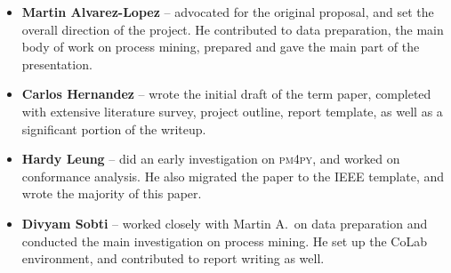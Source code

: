 \documentclass[conference]{IEEEtran}
\begin{document}
\begin{itemize}
\item \textbf{Martin Alvarez-Lopez} -- advocated for the original proposal,
and set the overall direction of the project. He contributed to
data preparation, the main body of work on process mining, prepared
and gave the main part of the presentation.

\item
\textbf{Carlos Hernandez} -- wrote the initial draft of the term paper,
completed with extensive literature survey, project outline,
report template, as well as a significant portion of the writeup.

\item
\textbf{Hardy Leung} -- did an early investigation on \textsc{pm4py}, and
worked on conformance analysis. He also migrated the paper to the IEEE
template, and wrote the majority of this paper.

\item
\textbf{Divyam Sobti} -- worked closely with Martin A.~on data preparation and
conducted the main investigation on process mining. He set up the CoLab
environment, and contributed to report writing as well.

\end{itemize}
\end{document}
